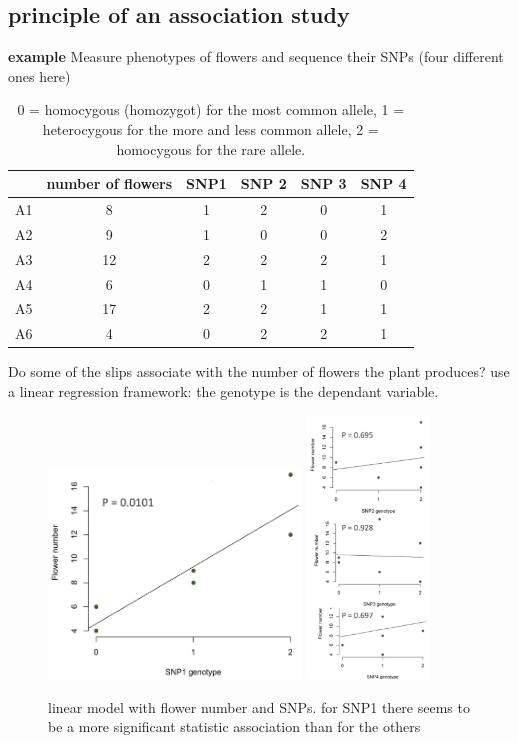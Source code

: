 \documentclass{article}
\begin{document}
\subsection{principle of an association study}
\textbf{example} Measure phenotypes of flowers and sequence their SNPs (four different ones here)
\begin{table}[H]
\centering
\caption{0 = homocygous (homozygot) for the most common allele, 1 = heterocygous for the more and less common allele, 2 = homocygous for the rare allele.}
\begin{tabular}{c|c|c|c|c|c}
& number of flowers & SNP1 & SNP 2 & SNP 3 & SNP 4 \\
\hline
A1 & 8 & 1 & 2 & 0 & 1 \\
\hline 
A2 & 9 & 1 & 0 & 0 & 2 \\
\hline
A3 & 12 & 2 & 2 & 2 & 1 \\
\hline 
A4 & 6 & 0 & 1 & 1 & 0 \\ 
\hline
A5 & 17 & 2 & 2 & 1 & 1 \\
\hline
A6 & 4 & 0 & 2 & 2 & 1 
\end{tabular}
\end{table}
Do some of the slips associate with the number of flowers the plant produces? use a linear regression framework: the genotype is the dependant variable.

\begin{figure}[H]
\centering
\includegraphics[width = 0.6\textwidth]{gwa/arabidopsis-lm.png}
\includegraphics[width = 0.29\textwidth]{gwa/arabidopsis-lm2.png}
\caption{linear model with flower number and SNPs. for SNP1 there seems to be a more significant statistic association than for the others}
\end{figure}
\end{document}
